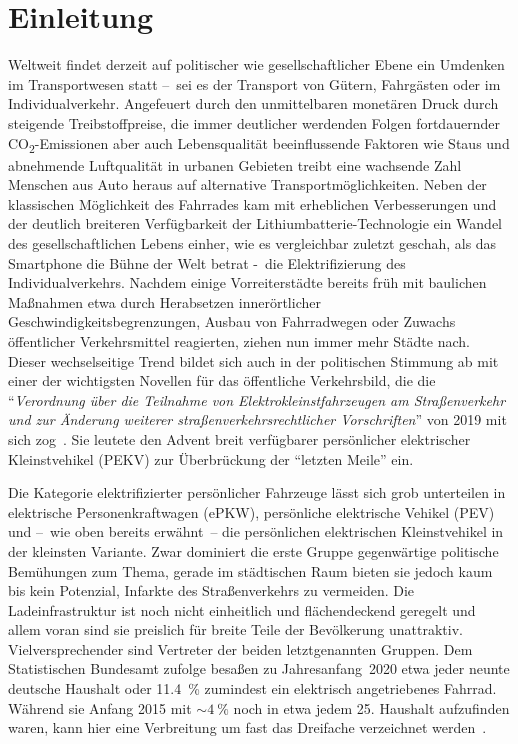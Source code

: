 \chapter{Einleitung}
	Weltweit findet derzeit auf politischer wie gesellschaftlicher Ebene ein Umdenken im Transportwesen statt --~sei es der Transport von Gütern, Fahrgästen oder im Individualverkehr.
	Angefeuert durch den unmittelbaren monetären Druck durch steigende Treibstoffpreise, die immer deutlicher werdenden Folgen fortdauernder CO\textsubscript{2}-Emissionen aber auch Lebensqualität beeinflussende Faktoren wie Staus und abnehmende Luftqualität in urbanen Gebieten treibt eine wachsende Zahl Menschen aus Auto heraus auf alternative Transportmöglichkeiten.
	Neben der klassischen Möglichkeit des Fahrrades kam mit erheblichen Verbesserungen und der deutlich breiteren Verfügbarkeit der Lithiumbatterie-Technologie ein Wandel des gesellschaftlichen Lebens einher, wie es vergleichbar zuletzt geschah, als das Smartphone die Bühne der Welt betrat -~die Elektrifizierung des Individualverkehrs.
	Nachdem einige Vorreiterstädte bereits früh mit baulichen Maßnahmen etwa durch Herabsetzen innerörtlicher Geschwindigkeitsbegrenzungen, Ausbau von Fahrradwegen oder Zuwachs öffentlicher Verkehrsmittel reagierten, ziehen nun immer mehr Städte nach.
	Dieser wechselseitige Trend bildet sich auch in der politischen Stimmung ab mit einer der wichtigsten Novellen für das öffentliche Verkehrsbild, die die ``\textit{Verordnung über die Teilnahme von Elektrokleinstfahrzeugen am Straßenverkehr und zur Änderung weiterer straßenverkehrsrechtlicher Vorschriften}'' von 2019 mit sich zog~\cite{Bundesgesetzblatt.2019}.
	Sie leutete den Advent breit verfügbarer persönlicher elektrischer Kleinstvehikel (PEKV) zur Überbrückung der ``letzten Meile'' ein.\par\medskip
	Die Kategorie elektrifizierter persönlicher Fahrzeuge lässt sich grob unterteilen in elektrische Personenkraftwagen (ePKW), persönliche elektrische Vehikel (PEV) und --~wie oben bereits erwähnt~-- die persönlichen elektrischen Kleinstvehikel in der kleinsten Variante.
	Zwar dominiert die erste Gruppe gegenwärtige politische Bemühungen zum Thema, gerade im städtischen Raum bieten sie jedoch kaum bis kein Potenzial, Infarkte des Straßenverkehrs zu vermeiden.
	Die Ladeinfrastruktur ist noch nicht einheitlich und flächendeckend geregelt und allem voran sind sie preislich für breite Teile der Bevölkerung unattraktiv.
	Vielversprechender sind Vertreter der beiden letztgenannten Gruppen.
	Dem Statistischen Bundesamt zufolge besaßen zu Jahresanfang~2020 etwa jeder neunte deutsche Haushalt oder \SI{11,4}{\percent} zumindest ein elektrisch angetriebenes Fahrrad.
	Während sie Anfang 2015 mit \(\sim \SI{4}{\percent}\) noch in etwa jedem 25. Haushalt aufzufinden waren, kann hier eine Verbreitung um fast das Dreifache verzeichnet werden~\cite{zahl.der.ebikes.StatistischesBundesamt.2020.09.28}.\par\medskip